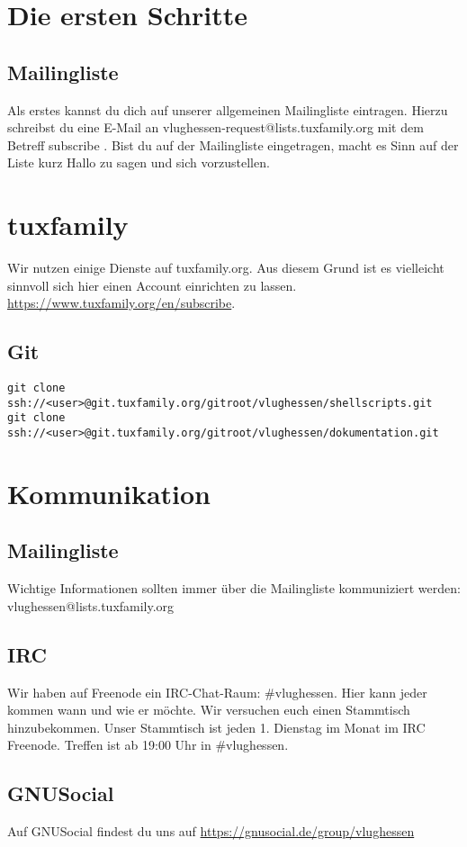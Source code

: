 \documentclass[a4paper,10pt,ngerman,titlepage,twoside]{scrreprt}
\begin{document}
\chapter{Die ersten Schritte}
\section{Mailingliste}
Als erstes kannst du dich auf unserer allgemeinen Mailingliste eintragen. Hierzu schreibst du eine E-Mail an
vlughessen-request@lists.tuxfamily.org mit dem Betreff subscribe .
Bist du auf der Mailingliste eingetragen, macht es Sinn auf der Liste kurz Hallo zu sagen und sich vorzustellen.
\chapter{tuxfamily}
Wir nutzen einige Dienste auf tuxfamily.org. Aus diesem Grund ist es vielleicht sinnvoll sich hier einen Account einrichten zu lassen.
\url{https://www.tuxfamily.org/en/subscribe}.
\section{Git}
\begin{lstlisting}[caption={Git repos}, label={listing:gitreposl}]
git clone ssh://<user>@git.tuxfamily.org/gitroot/vlughessen/shellscripts.git
git clone ssh://<user>@git.tuxfamily.org/gitroot/vlughessen/dokumentation.git
\end{lstlisting}
\chapter{Kommunikation}
\section{Mailingliste}
Wichtige Informationen sollten immer über die Mailingliste kommuniziert werden: vlughessen@lists.tuxfamily.org
\section{IRC}
Wir haben auf Freenode ein IRC-Chat-Raum: \#vlughessen. Hier kann jeder kommen wann und wie er möchte.
Wir versuchen euch einen Stammtisch hinzubekommen.
Unser Stammtisch ist jeden 1. Dienstag im Monat im IRC Freenode. Treffen ist ab 19:00 Uhr in \#vlughessen.
\section{GNUSocial}
Auf GNUSocial findest du uns auf \url{https://gnusocial.de/group/vlughessen}
\end{document}
